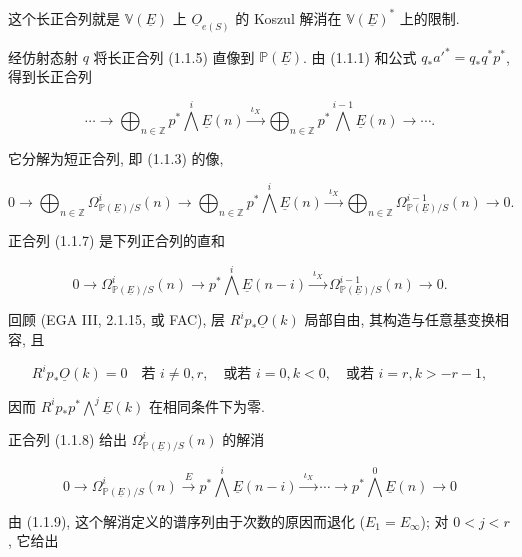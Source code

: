 这个长正合列就是 $\mathbb V(\underline E)$ 上 $\underline O_{e(S)}$ 的 Koszul 解消在 $\mathbb V(\underline E)^*$ 上的限制.

经仿射态射 $q$ 将长正合列 (1.1.5) 直像到 $\mathbb P(\underline E)$. 由 (1.1.1) 和公式 $q_*{a'}^*=q_*q^*p^*$, 得到长正合列

\begin{equation}\tag{1.1.6}
\cdots\longrightarrow
\bigoplus_{n\in\mathbb Z}p^*\bigwedge^i\underline E(n)
\xrightarrow{\ \iota_X\ }
\bigoplus_{n\in\mathbb Z}p^*\bigwedge^{i-1}\underline E(n)
\longrightarrow\cdots .
\end{equation}

它分解为短正合列, 即 (1.1.3) 的像,

\begin{equation}\tag{1.1.7}
0\longrightarrow
\bigoplus_{n\in\mathbb Z}\Omega^i_{\mathbb P(\underline E)/S}(n)
\longrightarrow
\bigoplus_{n\in\mathbb Z}p^*\bigwedge^i\underline E(n)
\xrightarrow{\ \iota_X\ }
\bigoplus_{n\in\mathbb Z}\Omega^{i-1}_{\mathbb P(\underline E)/S}(n)
\longrightarrow0.
\end{equation}

正合列 (1.1.7) 是下列正合列的直和

\begin{equation}\tag{1.1.8}
0\longrightarrow\Omega^i_{\mathbb P(\underline E)/S}(n)
\longrightarrow p^*\bigwedge^i\underline E(n-i)
\xrightarrow{\ \iota_X\ }
\Omega^{i-1}_{\mathbb P(\underline E)/S}(n)
\longrightarrow0.
\end{equation}

回顾 (EGA III, 2.1.15, 或 FAC), 层 $R^ip_*\underline O(k)$ 局部自由, 其构造与任意基变换相容, 且

\begin{equation}\tag{1.1.9}
R^ip_*\underline O(k)=0
\quad\text{若 }i\ne0,r,
\quad\text{或若 }i=0, k<0,
\quad\text{或若 }i=r, k>-r-1,
\end{equation}

因而 $R^ip_*p^*\bigwedge^j\underline E(k)$ 在相同条件下为零.

正合列 (1.1.8) 给出 $\Omega^i_{\mathbb P(\underline E)/S}(n)$ 的解消

\begin{equation}\tag{1.1.10}
0\longrightarrow\Omega^i_{\mathbb P(\underline E)/S}(n)
\xrightarrow{\ E\ }p^*\bigwedge^i\underline E(n-i)
\xrightarrow{\ \iota_X\ }\cdots\longrightarrow
p^*\bigwedge^0\underline E(n)\longrightarrow0
\end{equation}

由 (1.1.9), 这个解消定义的谱序列由于次数的原因而退化 ($E_1=E_\infty$); 对 $0<j<r$, 它给出

